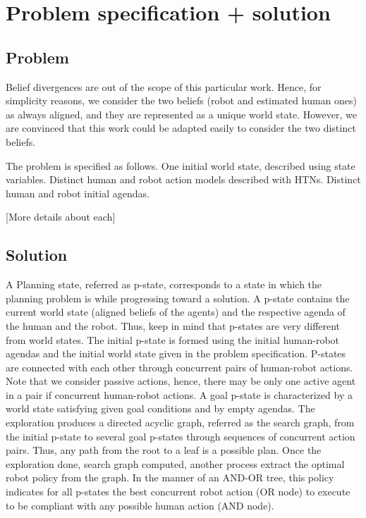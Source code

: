 \section{Problem specification + solution}

    \subsection{Problem}

Belief divergences are out of the scope of this particular work. Hence, for simplicity reasons, we consider the two beliefs (robot and estimated human ones) as always aligned, and they are represented as a unique world state. However, we are convinced that this work could be adapted easily to consider the two distinct beliefs.

The problem is specified as follows. One initial world state, described using state variables. Distinct human and robot action models described with HTNs. Distinct human and robot initial agendas. 

[More details about each]

    \subsection{Solution}

A Planning state, referred as p-state, corresponds to a state in which the planning problem is while progressing toward a solution. A p-state contains the current world state (aligned beliefs of the agents) and the respective agenda of the human and the robot. Thus, keep in mind that p-states are very different from world states.
The initial p-state is formed using the initial human-robot agendas and the initial world state given in the problem specification. P-states are connected with each other through concurrent pairs of human-robot actions. Note that we consider passive actions, hence, there may be only one active agent in a pair if concurrent human-robot actions. A goal p-state is characterized by a world state satisfying given goal conditions and by empty agendas.
The exploration produces a directed acyclic graph, referred as the search graph, from the initial p-state to several goal p-states through sequences of concurrent action pairs. Thus, any path from the root to a leaf is a possible plan. Once the exploration done, search graph computed, another process extract the optimal robot policy from the graph. In the manner of an AND-OR tree, this policy indicates for all p-states the best concurrent robot action (OR node) to execute to be compliant with any possible human action (AND node).

